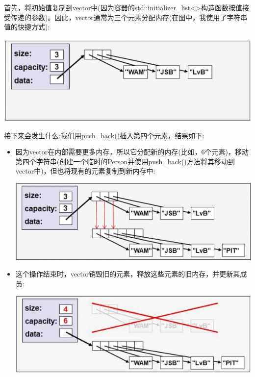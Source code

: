 首先，将初始值复制到vector中(因为容器的std::initializer\_list<>构造函数按值接受传递的参数)。因此，vector通常为三个元素分配内存(在图中，我使用了字符串值的快捷方式):\par

\begin{center}
	\includegraphics[width=1.0\textwidth]{content/1/chapter7/images/1}
\end{center}

接下来会发生什么:我们用push\_back()插入第四个元素，结果如下:\par

\begin{itemize}
	\item 因为vector在内部需要更多内存，所以它分配新的内存(比如，6个元素)，移动第四个字符串(创建一个临时的Person并使用push\_back()方法将其移动到vector中)，但也将现有的元素复制到新内存中:\par
	\begin{center}
		\includegraphics[width=1.0\textwidth]{content/1/chapter7/images/2}
	\end{center}
	\item 这个操作结束时，vector销毁旧的元素，释放这些元素的旧内存，并更新其成员:\par
	\begin{center}
		\includegraphics[width=1.0\textwidth]{content/1/chapter7/images/3}
	\end{center}
\end{itemize}

